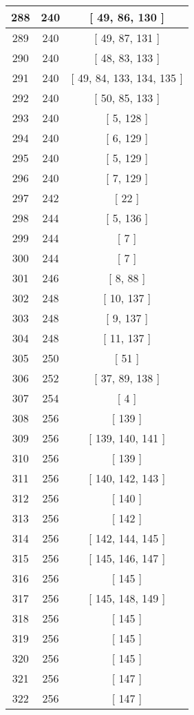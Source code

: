 \begin{center}
\begin{longtable}[H]{|| c c c ||}
\hline
288 & 240 & [ 49, 86, 130 ] \\ 
\hline
289 & 240 & [ 49, 87, 131 ] \\ 
\hline
290 & 240 & [ 48, 83, 133 ] \\ 
\hline
291 & 240 & [ 49, 84, 133, 134, 135 ] \\ 
\hline
292 & 240 & [ 50, 85, 133 ] \\ 
\hline
293 & 240 & [ 5, 128 ] \\ 
\hline
294 & 240 & [ 6, 129 ] \\ 
\hline
295 & 240 & [ 5, 129 ] \\ 
\hline
296 & 240 & [ 7, 129 ] \\ 
\hline
297 & 242 & [ 22 ] \\ 
\hline
298 & 244 & [ 5, 136 ] \\ 
\hline
299 & 244 & [ 7 ] \\ 
\hline
300 & 244 & [ 7 ] \\ 
\hline
301 & 246 & [ 8, 88 ] \\ 
\hline
302 & 248 & [ 10, 137 ] \\ 
\hline
303 & 248 & [ 9, 137 ] \\ 
\hline
304 & 248 & [ 11, 137 ] \\ 
\hline
305 & 250 & [ 51 ] \\ 
\hline
306 & 252 & [ 37, 89, 138 ] \\ 
\hline
307 & 254 & [ 4 ] \\ 
\hline
308 & 256 & [ 139 ] \\ 
\hline
309 & 256 & [ 139, 140, 141 ] \\ 
\hline
310 & 256 & [ 139 ] \\ 
\hline
311 & 256 & [ 140, 142, 143 ] \\ 
\hline
312 & 256 & [ 140 ] \\ 
\hline
313 & 256 & [ 142 ] \\ 
\hline
314 & 256 & [ 142, 144, 145 ] \\ 
\hline
315 & 256 & [ 145, 146, 147 ] \\ 
\hline
316 & 256 & [ 145 ] \\ 
\hline
317 & 256 & [ 145, 148, 149 ] \\ 
\hline
318 & 256 & [ 145 ] \\ 
\hline
319 & 256 & [ 145 ] \\ 
\hline
320 & 256 & [ 145 ] \\ 
\hline
321 & 256 & [ 147 ] \\ 
\hline
322 & 256 & [ 147 ] \\ 

\end{longtable}
\end{center}
